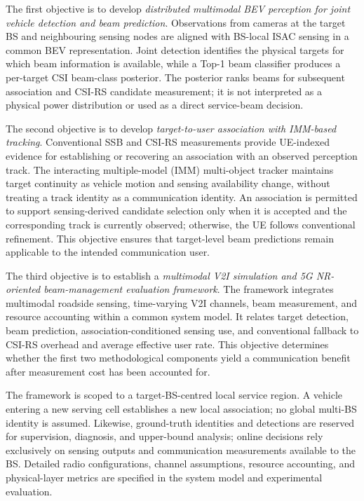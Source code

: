 The first objective is to develop \emph{distributed multimodal BEV perception
for joint vehicle detection and beam prediction}.  Observations from cameras at
the target BS and neighbouring sensing nodes are aligned with BS-local ISAC
sensing in a common BEV representation.  Joint detection identifies the
physical targets for which beam information is available, while a Top-1 beam
classifier produces a per-target CSI beam-class posterior.  The posterior ranks
beams for subsequent association and CSI-RS candidate measurement; it is not
interpreted as a physical power distribution or used as a direct service-beam
decision.

The second objective is to develop \emph{target-to-user association with
IMM-based tracking}.  Conventional SSB and CSI-RS measurements provide
UE-indexed evidence for establishing or recovering an association with an
observed perception track.  The interacting multiple-model (IMM) multi-object
tracker maintains target continuity as vehicle motion and sensing availability
change, without treating a track identity as a communication identity.  An
association is permitted to support sensing-derived candidate selection only
when it is accepted and the corresponding track is currently observed;
otherwise, the UE follows conventional refinement.  This objective ensures that
target-level beam predictions remain applicable to the intended communication
user.

The third objective is to establish a \emph{multimodal V2I simulation and 5G
NR-oriented beam-management evaluation framework}.  The framework integrates
multimodal roadside sensing, time-varying V2I channels, beam measurement, and
resource accounting within a common system model.  It relates target detection,
beam prediction, association-conditioned sensing use, and conventional fallback
to CSI-RS overhead and average effective user rate.  This objective determines
whether the first two methodological
components yield a communication benefit after measurement cost has been
accounted for.

The framework is scoped to a target-BS-centred local service region.  A vehicle
entering a new serving cell establishes a new local association; no global
multi-BS identity is assumed.  Likewise, ground-truth identities and detections
are reserved for supervision, diagnosis, and upper-bound analysis; online
decisions rely exclusively on sensing outputs and communication measurements
available to the BS.  Detailed radio configurations, channel assumptions,
resource accounting, and physical-layer metrics are specified in the system
model and experimental evaluation.


